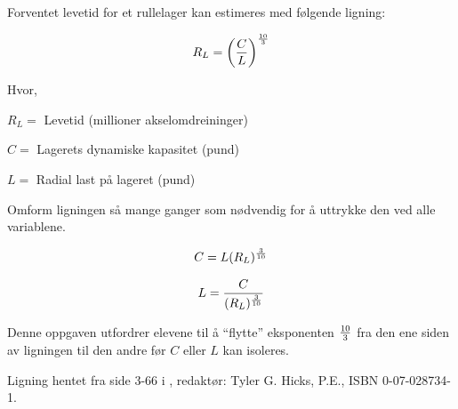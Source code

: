 

Forventet levetid for et rullelager kan estimeres med følgende ligning:

$$R_L = \biggl( {C \over L} \biggr)^{10 \over 3}$$

\noindent
Hvor,

$R_L =$ Levetid (millioner akselomdreininger)

$C =$ Lagerets dynamiske kapasitet (pund)

$L =$ Radial last på lageret (pund)

\vskip 10pt

Omform ligningen så mange ganger som nødvendig for å uttrykke den ved alle variablene.







$$C = L(R_L)^{3 \over 10}$$

$$L = {C \over (R_L)^{3 \over 10}}$$







Denne oppgaven utfordrer elevene til å ``flytte'' eksponenten ${10 \over 3}$ fra den ene siden av ligningen til den andre før $C$ eller $L$ kan isoleres.

\vskip 10pt

Ligning hentet fra side 3-66 i , redaktør: Tyler G. Hicks, P.E., ISBN 0-07-028734-1.



